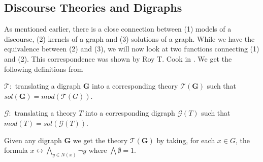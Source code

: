 \subsection{Discourse Theories and Digraphs}
\label{sub:Discourse Theories and Digraphs}
As mentioned earlier, there is a close connection between (1) models of a discourse, (2) kernels of a graph and (3) solutions of a graph.
While we have the equivalence between (2) and (3), we will now look at two functions connecting (1) and (2).
This correspondence was shown by Roy T. Cook in \cite{cook}.
We get the following definitions from \cite{apal-digraph}

$\mathcal{T}:$ translating a digraph \textbf{G} into a corresponding theory $\mathcal{T}(\mathbf{G})$ such that $sol(\mathbf{G}) = mod(\mathcal{T}(G))$.

$\mathcal{G}:$ translating a theory $T$ into a corresponding digraph $\mathcal{G}(T)$ such that $mod(T) = sol(\mathcal{G}(T))$.

Given any digraph \textbf{G} we get the theory $\mathcal{T}(\mathbf{G})$ by taking, for each $x \in G$, the formula $x \leftrightarrow \bigwedge_{y \in N(x)} \neg y$ where $\bigwedge \emptyset = 1$.\\

